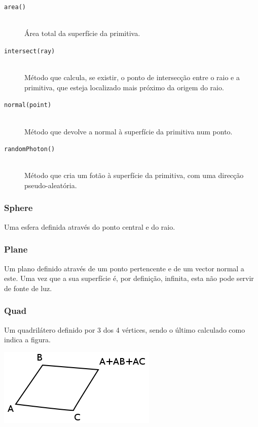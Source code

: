 \documentclass[a4paper]{article}
\begin{document}
\begin{description}
	\item [\texttt{area()}] \hfill \\
		Área total da superfície da primitiva.

	\item [\texttt{intersect(ray)}] \hfill \\
		Método que calcula, se existir, o ponto de intersecção entre o raio e a primitiva, que esteja localizado
		mais próximo da origem do raio.

	\item [\texttt{normal(point)}] \hfill \\
		Método que devolve a normal à superfície da primitiva num ponto.

	\item [\texttt{randomPhoton()}] \hfill \\
		Método que cria um fotão à superfície da primitiva, com uma direcção pseudo-aleatória.
 
\end{description}

\subsubsection{Sphere}
\indent \indent Uma esfera definida através do ponto central e do raio.   

\subsubsection{Plane}
\indent \indent Um plano definido através de um ponto pertencente e de um vector normal a este.
Uma vez que a sua superfície é, por definição, infinita, esta não pode servir de fonte de luz.

\subsubsection{Quad}
\indent \indent Um quadrilátero definido por 3 dos 4 vértices, sendo o último calculado como indica a figura.
\begin{center}
	\includegraphics[scale=0.50]{images/quad.png}
	\label{fig:quad}
\end{center}
\end{document}
